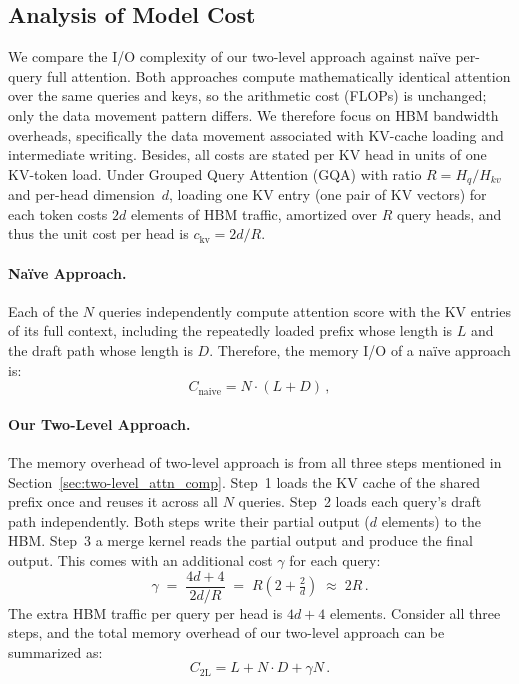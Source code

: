 \documentclass{article}
\begin{document}
 
\subsection{Analysis of Model Cost}
\label{subsec:complexity}
We compare the I/O complexity of our two-level approach against na\"ive per-query full attention.
Both approaches compute mathematically identical attention over the same queries and keys, so the arithmetic cost (FLOPs)
is unchanged; only the data movement pattern differs.
We therefore focus on HBM bandwidth overheads, specifically the data movement associated with KV-cache loading and intermediate writing. 
Besides, all costs are stated per KV head in units of one KV-token load.
Under Grouped Query Attention (GQA) \cite{ainslie2023gqatraininggeneralizedmultiquery} with ratio $R = H_q/H_{kv}$ and per-head dimension~$d$, 
loading one KV entry (one pair of KV vectors) for each token costs $2d$ elements of HBM traffic, amortized over $R$ query heads, and thus the unit cost per head is $c_{\mathrm{kv}} = 2d/R$.
 
\paragraph{Na\"ive Approach.}
Each of the $N$ queries independently compute attention score with the KV entries of its full context,
including the repeatedly loaded prefix whose length is $L$ and the draft path whose length is $D$.
Therefore, the memory I/O of a na\"ive approach is:
\begin{equation}
  C_{\mathrm{naive}} = N \cdot (L + D) \,,
  \label{eq:naive_cost}
\end{equation}

 
\paragraph{Our Two-Level Approach.}
The memory overhead of two-level approach is from all three steps mentioned in Section~\ref{sec:two-level_attn_comp}.
Step~1 loads the KV cache of the shared prefix once and reuses it across all $N$
queries.
Step~2 loads each query's draft path independently. Both steps write their partial output ($d$ elements) to the HBM. Step~3 a merge kernel reads the partial output and produce the final output. This comes with an additional cost $\gamma$ for each query:
\begin{equation}
  \gamma \;=\; \frac{4d + 4}{2d/R}
  \;=\; R\!\left(2 + \tfrac{2}{d}\right)
  \;\approx\; 2R\,.
  \label{eq:gamma}
\end{equation}
The extra HBM traffic per query
per head is $4d + 4$ elements.
Consider all three steps, and the total memory overhead of our two-level approach can be summarized as:
\begin{equation}
  C_{\mathrm{2L}} = L + N \cdot D + \gamma N\,.
  \label{eq:twolevel_cost}
\end{equation}
 
\end{document}
